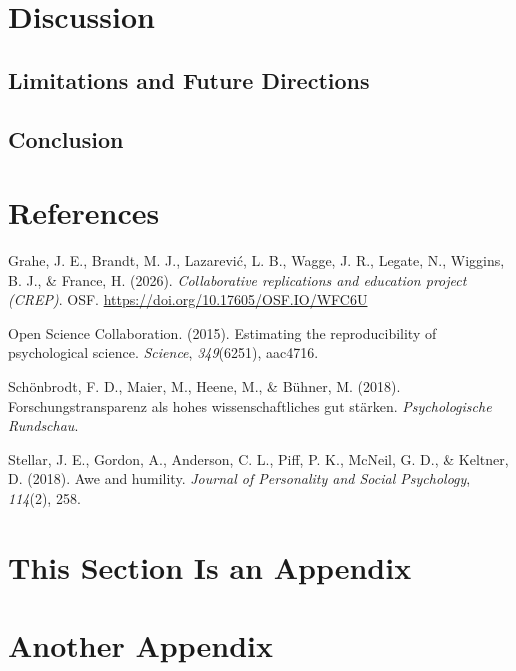 \documentclass[
  stu,
  longtable,
  nolmodern,
  notxfonts,
  notimes,
  colorlinks=true,linkcolor=blue,citecolor=blue,urlcolor=blue]{apa7}
\newlength{\cslhangindent}
\newenvironment{CSLReferences}[2] %
 {\begin{list}{}{%
  \setlength{\itemindent}{0pt}
  \setlength{\leftmargin}{0pt}
  \setlength{\parsep}{0pt}
  \ifodd #1
   \setlength{\leftmargin}{\cslhangindent}
   \setlength{\itemindent}{-1\cslhangindent}
  \fi
  \setlength{\itemsep}{#2\baselineskip}}}
 {\end{list}}
\begin{document}
\section{Discussion}\label{discussion}

\subsection{Limitations and Future
Directions}\label{limitations-and-future-directions}

\subsection{Conclusion}\label{conclusion}

\section{References}\label{references}

\protect{}\label{refs}
\begin{CSLReferences}{1}{0}
Grahe, J. E., Brandt, M. J., Lazarević, L. B., Wagge, J. R., Legate, N.,
Wiggins, B. J., \& France, H. (2026). \emph{Collaborative replications
and education project ({CREP})}. OSF.
\url{https://doi.org/10.17605/OSF.IO/WFC6U}

Open Science Collaboration. (2015). Estimating the reproducibility of
psychological science. \emph{Science}, \emph{349}(6251), aac4716.

Schönbrodt, F. D., Maier, M., Heene, M., \& Bühner, M. (2018).
Forschungstransparenz als hohes wissenschaftliches gut st{ä}rken.
\emph{Psychologische Rundschau}.

Stellar, J. E., Gordon, A., Anderson, C. L., Piff, P. K., McNeil, G. D.,
\& Keltner, D. (2018). Awe and humility. \emph{Journal of Personality
and Social Psychology}, \emph{114}(2), 258.

\end{CSLReferences}

\appendix

\section{This Section Is an Appendix}\label{apx-a}

\section{Another Appendix}\label{apx-b}
\end{document}
